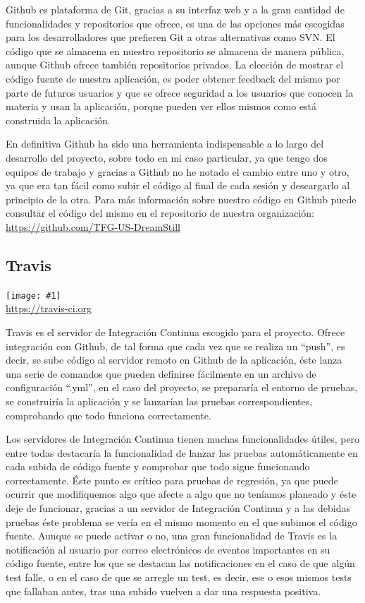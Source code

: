 \documentclass[11pt,openany]{book}
\newcommand{\logo}[2]{\medskip\begin{center}\texttt{[image: \#1]}\\\scriptsize\url{#2}\end{center}\bigskip}
\begin{document}
Github es plataforma de Git, gracias a su interfaz web y a la gran cantidad de funcionalidades y repositorios que ofrece, es una de las opciones más escogidas para los desarrolladores que prefieren Git a otras alternativas como SVN. El código que se almacena en nuestro repositorio se almacena de manera pública, aunque Github ofrece también repositorios privados. La elección de mostrar el código fuente de nuestra aplicación, es poder obtener feedback del mismo por parte de futuros usuarios y que se ofrece seguridad a los usuarios que conocen la materia y usan la aplicación, porque pueden ver ellos mismos como está construida la aplicación.

En definitiva Github ha sido una herramienta indispensable a lo largo del desarrollo del proyecto, sobre todo en mi caso particular, ya que tengo dos equipos de trabajo y gracias a Github no he notado el cambio entre uno y otro, ya que era tan fácil como subir el código al final de cada sesión y descargarlo al principio de la otra. Para más información sobre nuestro código en Github puede consultar el código del mismo en el repositorio de nuestra organización: \url{https://github.com/TFG-US-DreamStill}

\subsection{Travis}

\logo{logos/travis.png}{https://travis-ci.org}

Travis es el servidor de Integración Continua escogido para el proyecto. Ofrece integración con Github, de tal forma que cada vez que se realiza un ``push'', es decir, se sube código al servidor remoto en Github de la aplicación, éste lanza una serie de comandos que pueden definirse fácilmente en un archivo de configuración ``.yml'', en el caso del proyecto, se prepararía el entorno de pruebas, se construiría la aplicación y se lanzarían las pruebas correspondientes, comprobando que todo funciona correctamente.

Los servidores de Integración Continua tienen muchas funcionalidades útiles, pero entre todas destacaría la funcionalidad de lanzar las pruebas automáticamente en cada subida de código fuente y comprobar que todo sigue funcionando correctamente. Éste punto es crítico para pruebas de regresión, ya que puede ocurrir que modifiquemos algo que afecte a algo que no teníamos planeado y éste deje de funcionar, gracias a un servidor de Integración Continua y a las debidas pruebas éste problema se vería en el mismo momento en el que subimos el código fuente. Aunque se puede activar o no, una gran funcionalidad de Travis es la notificación al usuario por correo electrónicos de eventos importantes en su código fuente, entre los que se destacan las notificaciones en el caso de que algún test falle, o en el caso de que se arregle un test, es decir, ese o esos mismos tests que fallaban antes, tras una subido vuelven a dar una respuesta positiva.
\end{document}
